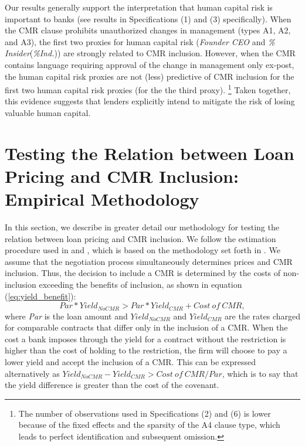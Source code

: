 \documentclass[12pt]{article}
\begin{document}
\begin{appendices}
Our results generally support the interpretation that human capital risk is important to banks (see results in Specifications (1) and (3) specifically).
When the CMR clause prohibits unauthorized changes in management (types A1, A2, and A3), the first two proxies for human capital risk  (\textit{Founder CEO} and \textit{\% Insider}(\textit{\%Ind.})) are strongly related to CMR inclusion.
However, when the CMR contains language requiring approval of the change in management only ex-post, the human capital risk proxies are not (less) predictive of CMR inclusion for the first two human capital risk proxies (for the the third proxy).%
    \footnote{The number of observations used in Specifications (2) and (6) is lower because of the fixed effects and the sparsity of the A4 clause type, which leads to perfect identification and subsequent omission.}
Taken together, this evidence suggests that lenders explicitly intend to mitigate the risk of losing valuable human capital.




\section{Testing the Relation between Loan Pricing and CMR Inclusion: Empirical Methodology}
 \label{IApp:pricing_description}

In this section, we describe in greater detail our methodology for testing the relation between loan pricing and CMR inclusion.
We follow the estimation procedure used in \cite{Miller_2012} and \cite{Bradley_2015}, which is based on the methodology set forth in \cite{Lee_1978}.
We assume that the negotiation process simultaneously determines prices and CMR inclusion.
Thus, the decision to include a CMR is determined by the costs of non-inclusion exceeding the benefits of inclusion, as shown in equation (\ref{eq:yield_benefit}): %
%
\begin{equation}\label{eq:yield_benefit}
Par*Yield_{NoCMR} > Par * Yield_{CMR} + Cost\ of\ CMR,
\end{equation}%
%
where \textit{Par} is the loan amount and $Yield_{NoCMR}$ and $Yield_{CMR}$ are the rates charged for comparable contracts that differ only in the inclusion of a CMR.
When the cost a bank imposes through the yield for a contract without the restriction is higher than the cost of holding to the restriction, the firm will choose to pay a lower yield and accept the inclusion of a CMR.
This can be expressed alternatively as $Yield_{NoCMR} - Yield_{CMR} > Cost\ of\ CMR / Par$, which is to say that the yield difference is greater than the cost of the covenant.



\end{appendices}
\end{document}
